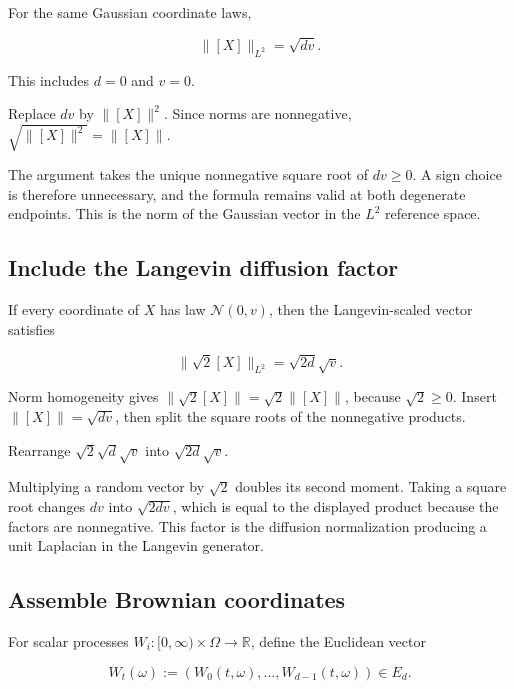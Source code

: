 \documentclass[11pt,a4paper]{report}
\begin{document}
For the same Gaussian coordinate laws,

\[\|[X]\|_{L^2}=\sqrt{dv}.\]

This includes \(d=0\) and \(v=0\).



Replace \(dv\) by \(\|[X]\|^2\). Since norms are nonnegative, \(\sqrt{\|[X]\|^2}=\|[X]\|\).



The argument takes the unique nonnegative square root of \(dv\ge0\). A sign choice is therefore unnecessary, and the formula remains valid at both degenerate endpoints. This is the norm of the Gaussian vector in the \(L^2\) reference space.

\subsection{\texorpdfstring{Include the Langevin diffusion factor}{Include the Langevin diffusion factor}}
\label{report-step-UnadjustedLangevin-GaussianMoments-lean-6}


If every coordinate of \(X\) has law \(\mathcal N(0,v)\), then the Langevin-scaled vector satisfies

\[\|\sqrt2[X]\|_{L^2}=\sqrt{2d}\sqrt v.\]

Norm homogeneity gives \(\|\sqrt2[X]\|=\sqrt2\|[X]\|\), because \(\sqrt2\ge0\). Insert \(\|[X]\|=\sqrt{dv}\), then split the square roots of the nonnegative products.



Rearrange \(\sqrt2\sqrt d\sqrt v\) into \(\sqrt{2d}\sqrt v\).



Multiplying a random vector by \(\sqrt2\) doubles its second moment. Taking a square root changes \(dv\) into \(\sqrt{2dv}\), which is equal to the displayed product because the factors are nonnegative. This factor is the diffusion normalization producing a unit Laplacian in the Langevin generator.

\subsection{\texorpdfstring{Assemble Brownian coordinates}{Assemble Brownian coordinates}}
\label{report-step-UnadjustedLangevin-GaussianMoments-lean-7}


For scalar processes \(W_i:[0,\infty)\times\Omega\to\mathbb R\), define the Euclidean vector

\[W_t(\omega):=(W_0(t,\omega),\ldots,W_{d-1}(t,\omega))\in E_d.\]
\end{document}
